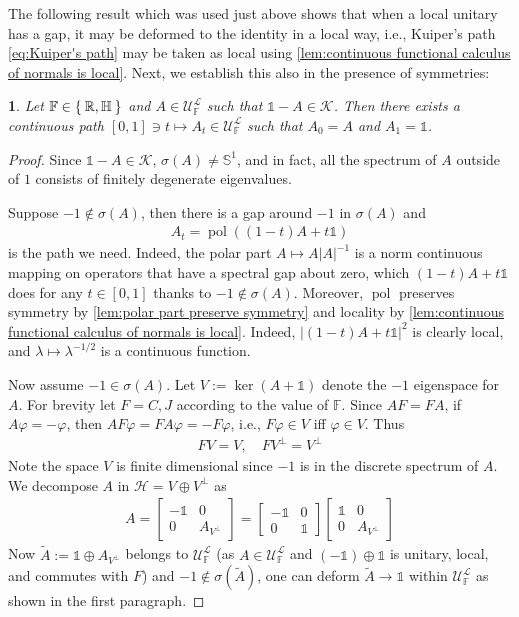 \documentclass[a4paper,10pt]{article}
\numberwithin{equation}{section}
\theoremstyle{plain}
\theoremstyle{plain}
\newtheorem{lem}[thm]{\protect\lemmaname}
\theoremstyle{plain}
\theoremstyle{plain}
\theoremstyle{plain}
\theoremstyle{remark}
\theoremstyle{definition}
\theoremstyle{plain}
\providecommand{\lemmaname}{Lemma}
\newcommand{\bS}{\mathbb{S}}
\newcommand{\RR}{\mathbb{R}}
\newcommand{\FF}{\mathbb{F}}
\newcommand{\calU}{\mathcal{U}}
\newcommand{\calH}{\mathcal{H}}
\newcommand{\calK}{\mathcal{K}}
\newcommand{\calL}{\mathcal{L}}
\newcommand{\Id}{\mathds{1}}
\newcommand{\HH}{\mathbb{H}}
\newcommand{\eq}[1]{\begin{align*}#1\end{align*}}
\newcommand{\polar}{\operatorname{pol}}
\begin{document}
	The following result which was used just above shows that when a local unitary has a gap, it may be deformed to the identity in a local way, i.e., Kuiper's path \cref{eq:Kuiper's path} may be taken as local using \cref{lem:continuous functional calculus of normals is local}. Next, we establish this also in the presence of symmetries:
	\begin{lem}\label{lem:deform A to Id obeying RCH symmetry}
		Let $\FF\in\Set{\RR,\HH}$ and $A\in\calU_\FF^\calL$ such that $\Id-A\in\calK$. Then there exists a continuous path $[0,1]\ni t\mapsto A_t\in\calU_\FF^\calL$ such that $A_0=A$ and $A_1=\Id$.
	\end{lem}
	\begin{proof}
		Since $\Id-A\in\calK$, $\sigma(A)\neq\bS^1$, and in fact, all the spectrum of $A$ outside of $1$ consists of finitely degenerate eigenvalues.
		
		Suppose $-1\notin\sigma(A)$, then there is a gap around $-1$ in $\sigma(A)$ and \eq{A_t=\polar((1-t)A+t\Id)} is the path we need. Indeed, the polar part $A\mapsto A|A|^{-1}$ is a norm continuous mapping on operators that have a spectral gap about zero, which $(1-t)A+t\Id$ does for any $t\in[0,1]$ thanks to $-1\notin\sigma(A)$. Moreover, $\polar$ preserves symmetry by \cref{lem:polar part preserve symmetry} and locality by \cref{lem:continuous functional calculus of normals is local}. Indeed, $|(1-t)A+t\Id|^2$ is clearly local, and $\lambda\mapsto\lambda^{-1/2}$ is a continuous function.
		
		Now assume $-1\in \sigma(A)$. Let $V:=\ker (A+\Id)$ denote the $-1$ eigenspace for $A$. For brevity let $F=C,J$ according to the value of $\FF$. Since $AF=FA$, if $A\varphi=-\varphi$, then $AF\varphi=FA\varphi=-F\varphi$, i.e., $F\varphi\in V$ iff $\varphi\in V$. Thus \eq{FV=V,\quad FV^\perp=V^\perp} Note the space $V$ is finite dimensional since $-1$ is in the discrete spectrum of $A$. We decompose $A$ in $\calH=V\oplus V^\perp$ as \eq{A=\begin{bmatrix}-\Id & 0 \\ 0 & A_{V^\perp}\end{bmatrix}=\begin{bmatrix}-\Id & 0 \\ 0 & \Id\end{bmatrix}\begin{bmatrix}\Id & 0 \\ 0 & A_{V^\perp}\end{bmatrix}} Now $\widetilde{A}:=\Id\oplus A_{V^\perp}$ belongs to $\calU_\FF^\calL$ (as $A\in\calU^\calL_\FF$ and $(-\Id)\oplus\Id$ is unitary, local, and commutes with $F$) and $-1\notin \sigma(\widetilde{A})$, one can deform $\widetilde{A}\to \Id$ within $\calU_\FF^\calL$ as shown in the first paragraph.
		

\end{proof}
\end{document}
